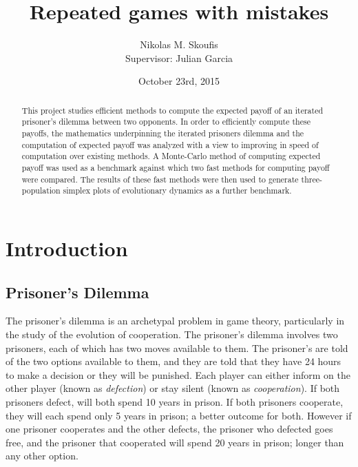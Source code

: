 \documentclass[a4paper,12pt]{article}
\begin{document}
\title{Repeated games with mistakes}
\author{Nikolas M. Skoufis \\ Supervisor: Julian Garcia}
\date{October 23rd, 2015}

\maketitle

\begin{abstract}

This project studies efficient methods to compute the expected payoff of an iterated prisoner's dilemma between two opponents.
In order to efficiently compute these payoffs, the mathematics underpinning the iterated prisoners dilemma and the computation of expected payoff was analyzed with a view to improving in speed of computation over existing methods.
A Monte-Carlo method of computing expected payoff was used as a benchmark against which two fast methods for computing payoff were compared.
The results of these fast methods were then used to generate three-population simplex plots of evolutionary dynamics as a further benchmark.

\end{abstract}

\section{Introduction}

\subsection{Prisoner's Dilemma}

The prisoner's dilemma is an archetypal problem in game theory, particularly in the study of the evolution of cooperation.
The prisoner's dilemma involves two prisoners, each of which has two moves available to them.
The prisoner's are told of the two options available to them, and they are told that they have 24 hours to make a decision or they will be punished.
Each player can either inform on the other player (known as \textit{defection}) or stay silent (known as \textit{cooperation}).
If both prisoners defect, will both spend 10 years in prison.
If both prisoners cooperate, they will each spend only 5 years in prison; a better outcome for both.
However if one prisoner cooperates and the other defects, the prisoner who defected goes free, and the prisoner that cooperated will spend 20 years in prison; longer than any other option.
\end{document}
